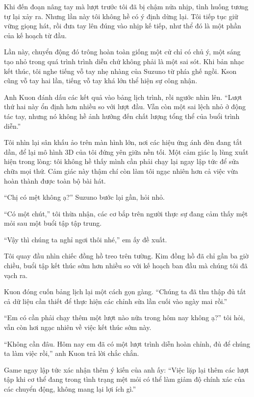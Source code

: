 ﻿\documentclass[../main.tex]{subfiles}
\begin{document}
Khi đến đoạn nâng tay mà lượt trước tôi đã bị chậm nửa nhịp, tình huống tương tự lại xảy ra. Nhưng lần này tôi không hề có ý định dừng lại. Tôi tiếp tục giữ vững giọng hát, rồi đưa tay lên đúng vào nhịp kế tiếp, như thể đó là một phần của kế hoạch từ đầu.

Lần này, chuyển động đó trông hoàn toàn giống một cử chỉ có chủ ý, một sáng tạo nhỏ trong quá trình trình diễn chứ không phải là một sai sót. Khi bản nhạc kết thúc, tôi nghe tiếng vỗ tay nhẹ nhàng của Suzuno từ phía ghế ngồi. Kson cũng vỗ tay hai lần, tiếng vỗ tay khá lớn thể hiện sự công nhận.

Anh Kuon đánh dấu các kết quả vào bảng lịch trình, rồi ngước nhìn lên. ``Lượt thứ hai này ổn định hơn nhiều so với lượt đầu. Vẫn còn một sai lệch nhỏ ở động tác tay, nhưng nó không hề ảnh hưởng đến chất lượng tổng thể của buổi trình diễn.''

Tôi nhìn lại sân khấu ảo trên màn hình lớn, nơi các hiệu ứng ánh đèn đang tắt dần, để lại mô hình 3D của tôi đứng yên giữa nền tối. Một cảm giác lạ lùng xuất hiện trong lòng: tôi không hề thấy mình cần phải chạy lại ngay lập tức để sửa chữa mọi thứ. Cảm giác này thậm chí còn làm tôi ngạc nhiên hơn cả việc vừa hoàn thành được toàn bộ bài hát.

``Chị có mệt không ạ?'' Suzuno bước lại gần, hỏi nhỏ.

``Có một chút,'' tôi thừa nhận, các cơ bắp trên người thực sự đang cảm thấy mệt mỏi sau một buổi tập tập trung.

``Vậy thì chúng ta nghỉ ngơi thôi nhé,'' em ấy đề xuất.

Tôi quay đầu nhìn chiếc đồng hồ treo trên tường. Kim đồng hồ đã chỉ gần ba giờ chiều, buổi tập kết thúc sớm hơn nhiều so với kế hoạch ban đầu mà chúng tôi đã vạch ra.

Kuon đóng cuốn bảng lịch lại một cách gọn gàng. ``Chúng ta đã thu thập đủ tất cả dữ liệu cần thiết để thực hiện các chỉnh sửa lần cuối vào ngày mai rồi.''

``Em có cần phải chạy thêm một lượt nào nữa trong hôm nay không ạ?'' tôi hỏi, vẫn còn hơi ngạc nhiên về việc kết thúc sớm này.

``Không cần đâu. Hôm nay em đã có một lượt trình diễn hoàn chỉnh, đủ để chúng ta làm việc rồi,'' anh Kuon trả lời chắc chắn.

Game ngay lập tức xác nhận thêm ý kiến của anh ấy: ``Việc lặp lại thêm các lượt tập khi cơ thể đang trong tình trạng mệt mỏi có thể làm giảm độ chính xác của các chuyển động, không mang lại lợi ích gì.''
\end{document}
